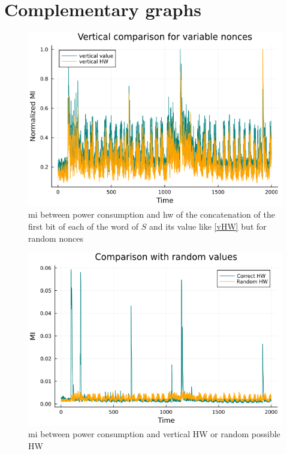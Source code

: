 \documentclass[11pt,technote]{IEEEtran}
\begin{document}
		\section{Complementary graphs}
		\begin{figure}[H]
			\centering
			\includegraphics[scale=0.3]{img_files/vertical_one_byte}
			\caption{\ac{mi} between power consumption and \ac{hw} of the concatenation of the first bit of each of the word of $S$ and its value like \ref{vHW} but for random nonces}
			\label{vHW&val}
		\end{figure}
		
		\begin{figure}[H]
			\centering
			\includegraphics[scale=0.3]{img_files/HWalea}
			\caption{\ac{mi} between power consumption and vertical HW or random possible HW}
			\label{HWalea}
		\end{figure}
		
\end{document}
